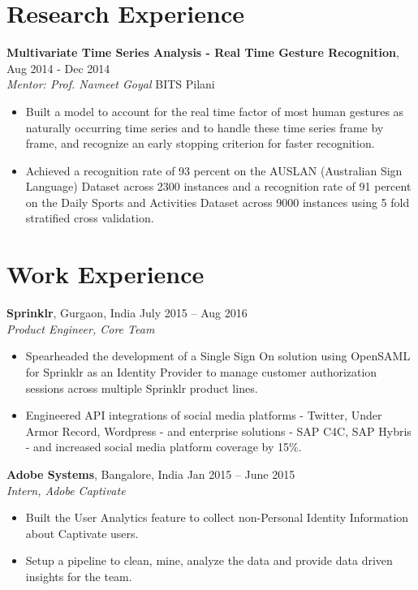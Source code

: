 \documentclass[letterpaper]{article}
\begin{document}
\section*{Research Experience}
\textbf{Multivariate Time Series Analysis - Real Time Gesture Recognition},  \hfill
Aug 2014 - Dec 2014
\\ \emph{Mentor: Prof. Navneet Goyal} \hfill
BITS Pilani\\
\vspace{-6mm}
\begin{itemize}
\item Built a model to account for the real time factor of most human gestures as naturally occurring time series and to handle these time series frame by frame, and recognize an early stopping criterion for faster recognition. 
\vspace{-2mm}
\item Achieved a recognition rate of 93 percent on the AUSLAN (Australian Sign Language) Dataset across 2300 instances and a recognition rate of 91 percent on the Daily Sports and Activities Dataset across 9000 instances using 5 fold stratified cross validation.
\end{itemize}

\section*{Work Experience}
\textbf{Sprinklr}, Gurgaon, India \hfill July 2015 -- Aug 2016\\
\emph{Product Engineer, Core Team}\\
\vspace{-6mm}
\begin{itemize}
\item Spearheaded the development of a Single Sign On solution using OpenSAML for Sprinklr as an Identity Provider to manage customer authorization sessions across multiple Sprinklr product lines.
\vspace{-2mm}
\item Engineered API integrations of  social media platforms - Twitter, Under Armor Record, Wordpress - and enterprise solutions - SAP C4C, SAP Hybris - and increased social media platform coverage by 15\%. 
\end{itemize}

\vspace{-0.5mm}
\textbf{Adobe Systems}, Bangalore, India \hfill Jan 2015 -- June 2015\\
\emph{Intern, Adobe Captivate}\\
\vspace{-6mm}
\begin{itemize}
\item Built the User Analytics feature to collect non-Personal Identity Information about Captivate users. 
\vspace{-2mm}
\item Setup a pipeline to clean, mine, analyze the data and provide data driven insights for the team.
\end{itemize}
\end{document}
